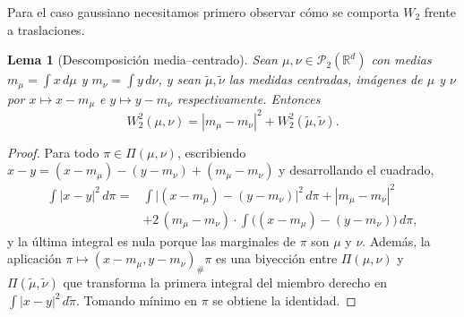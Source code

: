 \documentclass[12pt, a4paper]{amsbook}
\newcommand{\R}{{\mathbb R}}
\newtheorem{lema}[teo]{Lema}
\theoremstyle{remark}
\theoremstyle{definition}
\numberwithin{section}{chapter}
\numberwithin{subsection}{section}
\numberwithin{equation}{section}
\numberwithin{figure}{chapter}
\begin{document}
Para el caso gaussiano necesitamos primero observar cómo se comporta $W_2$
frente a traslaciones.

\begin{lema}[Descomposición media--centrado]\label{lema.W2.media}
Sean $\mu,\nu\in\mathcal P_2(\R^d)$ con medias $m_\mu=\int x\,d\mu$ y
$m_\nu=\int y\,d\nu$, y sean $\widetilde\mu,\widetilde\nu$ las medidas
centradas, imágenes de $\mu$ y $\nu$ por $x\mapsto x-m_\mu$ e $y\mapsto y-m_\nu$
respectivamente. Entonces
\[
W_2^2(\mu,\nu)=|m_\mu-m_\nu|^2+W_2^2(\widetilde\mu,\widetilde\nu).
\]
\end{lema}

\begin{proof}
Para todo $\pi\in\Pi(\mu,\nu)$, escribiendo
$x-y=(x-m_\mu)-(y-m_\nu)+(m_\mu-m_\nu)$ y desarrollando el cuadrado,
\[
\begin{aligned}
\int|x-y|^2\,d\pi
={}&\int\bigl|(x-m_\mu)-(y-m_\nu)\bigr|^2\,d\pi
+|m_\mu-m_\nu|^2\\
&+2\,(m_\mu-m_\nu)\cdot\int\bigl((x-m_\mu)-(y-m_\nu)\bigr)\,d\pi,
\end{aligned}
\]
y la última integral es nula porque las marginales de $\pi$ son $\mu$ y $\nu$.
Además, la aplicación $\pi\mapsto(x-m_\mu,y-m_\nu)_\#\pi$ es una biyección
entre $\Pi(\mu,\nu)$ y $\Pi(\widetilde\mu,\widetilde\nu)$ que transforma la
primera integral del miembro derecho en $\int|x-y|^2\,d\widetilde\pi$.
Tomando mínimo en $\pi$ se obtiene la identidad.
\end{proof}
\end{document}

